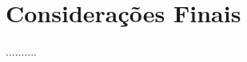 \documentclass[a4paper, 12pt, openright, oneside, german, french, english, brazil]{abntex2}
\begin{document}
		

	\chapter{Considerações Finais}


	..........
\end{document}
